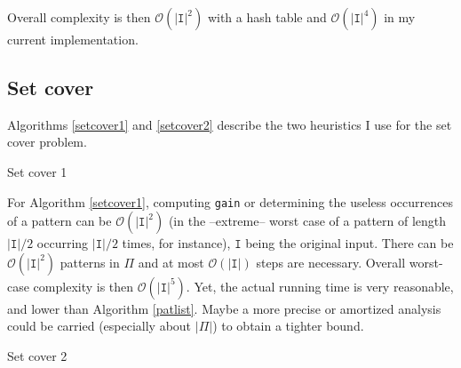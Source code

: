 \documentclass[a4paper,10pt]{article}
\newcommand{\bigO}[1]{\mathcal O\left( #1 \right)}
\begin{document}
Overall complexity is then $\bigO{|\texttt{I}|^2}$ with a hash table and $\bigO{|\texttt{I}|^4}$ in my current implementation.

\newpage

\subsection*{Set cover}

Algorithms \ref{setcover1} and \ref{setcover2} describe the two heuristics I use for the set cover problem.


\begin{algorithm}
\caption{Set cover 1 \label{setcover1}}
   
 


\end{algorithm}

For Algorithm \ref{setcover1}, computing \texttt{gain} or determining the useless occurrences of a pattern can be $\bigO{|\texttt{I}|^2}$ (in the --extreme-- worst case of a pattern of length $|\texttt{I}|/2$ occurring $|\texttt{I}|/2$ times, for instance), $\texttt{I}$ being the original input. There can be $\bigO{|\texttt{I}|^2}$ patterns in $\Pi$ and at most $\bigO{|\texttt{I}|}$ steps are necessary. Overall worst-case complexity is then $\bigO{|\texttt{I}|^5}$. Yet, the actual running time is very reasonable, and lower than Algorithm \ref{patlist}. Maybe a more precise or amortized analysis could be carried (especially about $|\Pi|$) to obtain a tighter bound.

\begin{algorithm}
\caption{Set cover 2 \label{setcover2}}
    
  


\end{algorithm}
\end{document}

